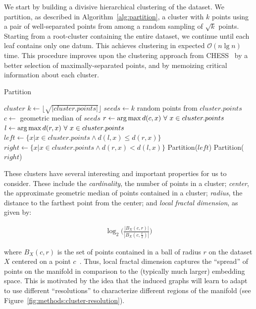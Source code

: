We start by building a divisive hierarchical clustering of the dataset.
We partition, as described in Algorithm~\ref{alg:partition}, a cluster with $k$ points using a pair of well-separated points from among a random sampling of $\sqrt k$ points.
Starting from a root-cluster containing the entire dataset, we continue until each leaf contains only one datum.
This achieves clustering in expected $\mathcal{O}(n \lg n)$ time.
This procedure improves upon the clustering approach from CHESS~\cite{ishaq2019clustered} by a better selection of maximally-separated points, and by memoizing critical information about each cluster.

\begin{algorithm} %
\caption{Partition} %
\label{alg:partition} %
\begin{algorithmic}[1] %
    \REQUIRE $cluster$
    \STATE $k \leftarrow \lfloor \sqrt{|cluster.points|} \rfloor$
    \STATE $seeds \leftarrow k$ random points from $cluster.points$
    \STATE $c \leftarrow$ geometric median of $seeds$
    \STATE $r \leftarrow \operatorname*{arg\,max} d(c,x) \ \forall \ x \in cluster.points$
    \STATE $l \leftarrow \operatorname*{arg\,max} d(r,x) \ \forall \ x \in cluster.points$
    \STATE $left \leftarrow \{x | x \in cluster.points \land d(l,x) \le d(r,x)\}$
    \STATE $right \leftarrow \{x | x \in cluster.points \land d(r,x) < d(l,x)\}$
        \STATE Partition($left$)
    \ENDIF
        \STATE Partition($right$)
    \ENDIF
\end{algorithmic}
\end{algorithm}

These clusters have several interesting and important properties for us to consider.
These include the \textit{cardinality}, the number of points in a cluster;
\textit{center}, the approximate geometric median of points contained in a cluster;
\textit{radius}, the distance to the farthest point from the center;
and \textit{local fractal dimension},
as given by:

\begin{gather}
    \log_2\bigg(\frac{|B_X(c, r)|}{|B_X(c, \frac{r}{2})|}\bigg)
    \label{fractal-dimension}
\end{gather}

where $B_X(c,r)$ is the set of points contained in a ball of radius $r$ on the dataset $X$ centered on a point $c$~\cite{ishaq2019clustered}.
Thus, local fractal dimension captures the ``spread'' of points on the manifold in comparison to the (typically much larger) embedding space.
This is motivated by the idea that the induced graphs will learn to adapt to use different ``resolutions'' to characterize different regions of the manifold (see Figure~\ref{fig:methods:cluster-resolution}).

